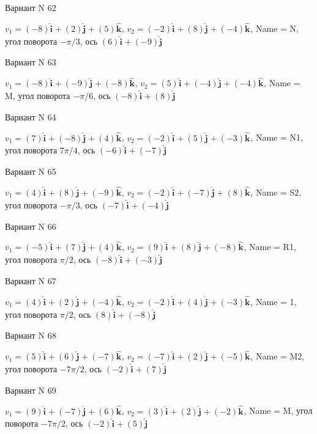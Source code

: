 \documentclass[11pt]{report}
\begin{document}
Вариант N 62

$v_1 = (-8)\mathbf{\hat{i}_{}} + (2)\mathbf{\hat{j}_{}} + (5)\mathbf{\hat{k}_{}}$, $v_2 = (-2)\mathbf{\hat{i}_{}} + (8)\mathbf{\hat{j}_{}} + (-4)\mathbf{\hat{k}_{}}$, Name = N, угол поворота $- \pi / 3$, ось $(6)\mathbf{\hat{i}_{}} + (-9)\mathbf{\hat{j}_{}}$

Вариант N 63

$v_1 = (-8)\mathbf{\hat{i}_{}} + (-9)\mathbf{\hat{j}_{}} + (-8)\mathbf{\hat{k}_{}}$, $v_2 = (5)\mathbf{\hat{i}_{}} + (-4)\mathbf{\hat{j}_{}} + (-4)\mathbf{\hat{k}_{}}$, Name = M, угол поворота $- \pi / 6$, ось $(-8)\mathbf{\hat{i}_{}} + (8)\mathbf{\hat{j}_{}}$

Вариант N 64

$v_1 = (7)\mathbf{\hat{i}_{}} + (-8)\mathbf{\hat{j}_{}} + (4)\mathbf{\hat{k}_{}}$, $v_2 = (-2)\mathbf{\hat{i}_{}} + (5)\mathbf{\hat{j}_{}} + (-3)\mathbf{\hat{k}_{}}$, Name = N1, угол поворота $7 \pi / 4$, ось $(-6)\mathbf{\hat{i}_{}} + (-7)\mathbf{\hat{j}_{}}$

Вариант N 65

$v_1 = (4)\mathbf{\hat{i}_{}} + (8)\mathbf{\hat{j}_{}} + (-9)\mathbf{\hat{k}_{}}$, $v_2 = (-2)\mathbf{\hat{i}_{}} + (-7)\mathbf{\hat{j}_{}} + (8)\mathbf{\hat{k}_{}}$, Name = S2, угол поворота $- \pi / 3$, ось $(-7)\mathbf{\hat{i}_{}} + (-4)\mathbf{\hat{j}_{}}$

Вариант N 66

$v_1 = (-5)\mathbf{\hat{i}_{}} + (7)\mathbf{\hat{j}_{}} + (4)\mathbf{\hat{k}_{}}$, $v_2 = (9)\mathbf{\hat{i}_{}} + (8)\mathbf{\hat{j}_{}} + (-8)\mathbf{\hat{k}_{}}$, Name = R1, угол поворота $\pi / 2$, ось $(-8)\mathbf{\hat{i}_{}} + (-3)\mathbf{\hat{j}_{}}$

Вариант N 67

$v_1 = (4)\mathbf{\hat{i}_{}} + (2)\mathbf{\hat{j}_{}} + (-4)\mathbf{\hat{k}_{}}$, $v_2 = (-2)\mathbf{\hat{i}_{}} + (4)\mathbf{\hat{j}_{}} + (-3)\mathbf{\hat{k}_{}}$, Name = 1, угол поворота $\pi / 2$, ось $(8)\mathbf{\hat{i}_{}} + (-8)\mathbf{\hat{j}_{}}$

Вариант N 68

$v_1 = (5)\mathbf{\hat{i}_{}} + (6)\mathbf{\hat{j}_{}} + (-7)\mathbf{\hat{k}_{}}$, $v_2 = (-7)\mathbf{\hat{i}_{}} + (2)\mathbf{\hat{j}_{}} + (-5)\mathbf{\hat{k}_{}}$, Name = M2, угол поворота $- 7 \pi / 2$, ось $(-2)\mathbf{\hat{i}_{}} + (7)\mathbf{\hat{j}_{}}$

Вариант N 69

$v_1 = (9)\mathbf{\hat{i}_{}} + (-7)\mathbf{\hat{j}_{}} + (6)\mathbf{\hat{k}_{}}$, $v_2 = (3)\mathbf{\hat{i}_{}} + (2)\mathbf{\hat{j}_{}} + (-2)\mathbf{\hat{k}_{}}$, Name = M, угол поворота $- 7 \pi / 2$, ось $(-2)\mathbf{\hat{i}_{}} + (5)\mathbf{\hat{j}_{}}$
\end{document}

